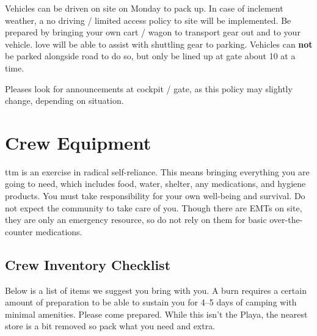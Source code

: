 Vehicles can be driven on site on Monday to pack up. In case of inclement weather, a no driving / limited access policy to site will be implemented. Be prepared by bringing your own cart / wagon to transport gear out and to your vehicle.
\Gls{love} will be able to assist with shuttling gear to parking. 
Vehicles can \textbf{not} be parked alongside road to do so, but only be lined up at gate about 10 at a time.

Pleases look for announcements at \Gls{cockpit} / \Gls{gate}, as this policy may slightly change, depending on situation. 






\section*{Crew Equipment}
\gls{ttm} is an exercise in radical self-reliance.  This means bringing everything you are going to need, which includes food, water, shelter, any medications, and hygiene products.  You must take responsibility for your own well-being and survival.  Do not expect the community to take care of you.  Though there are EMTs on site, they are only an emergency resource, so do not rely on them for basic over-the-counter medications.

\subsection*{Crew Inventory Checklist}
Below is a list of items we suggest you bring with you.  A burn requires a certain amount of preparation to be able to sustain you for 4--5 days of camping with minimal amenities. Please come prepared.  While this isn't the Playa, the nearest store is a bit removed so pack what you need and extra.  

